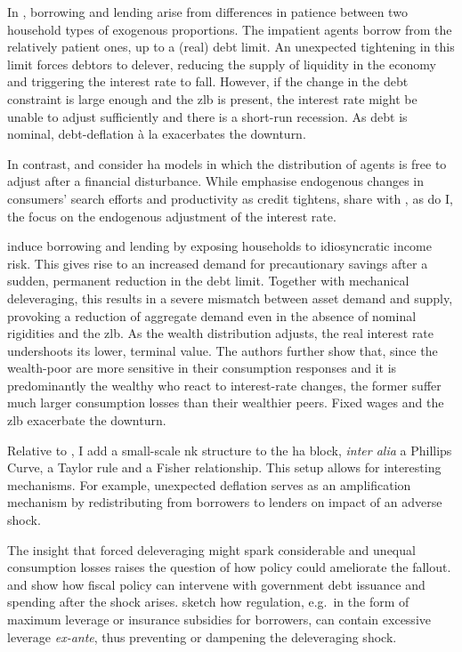 \documentclass[a4paper,12pt]{article} %
\numberwithin{equation}{section} %
\numberwithin{figure}{section}
\numberwithin{table}{section}
\begin{document}
In \textcite{egg2012}, borrowing and lending arise from differences in patience between two household types of exogenous proportions. The impatient agents borrow from the relatively patient ones, up to a (real) debt limit. An unexpected tightening in this limit forces debtors to delever, reducing the supply of liquidity in the economy and triggering the interest rate to fall. However, if the change in the debt constraint is large enough and the \Gls{zlb} is present, the interest rate might be unable to adjust sufficiently and there is a short-run recession. As debt is nominal, debt-deflation à la \textcite{fisher1933} exacerbates the downturn.

In contrast, \textcite{riosrull2015} and \textcite{gl2017} consider \Gls{ha} models in which the distribution of agents is free to adjust after a financial disturbance. While \textcite{riosrull2015} emphasise endogenous changes in consumers' search efforts and productivity as credit tightens, \textcite{gl2017} share with \textcite{egg2012}, as do I, the focus on the endogenous adjustment of the interest rate.

\textcite{gl2017} induce borrowing and lending by exposing households to idiosyncratic income risk. This gives rise to an increased demand for precautionary savings after a sudden, permanent reduction in the debt limit. Together with mechanical deleveraging, this results in a severe mismatch between asset demand and supply, provoking a reduction of aggregate demand even in the absence of nominal rigidities and the \Gls{zlb}. As the wealth distribution adjusts, the real interest rate undershoots its lower, terminal value. The authors further show that, since the wealth-poor are more sensitive in their consumption responses and it is predominantly the wealthy who react to interest-rate changes, the former suffer much larger consumption losses than their wealthier peers. Fixed wages and the \Gls{zlb} exacerbate the downturn. 

Relative to \textcite{gl2017}, I add a small-scale \Gls{nk} structure to the \Gls{ha} block, \textit{inter alia} a Phillips Curve, a Taylor rule and a Fisher relationship. This setup allows for interesting mechanisms. For example, unexpected deflation serves as an amplification mechanism by redistributing from borrowers to lenders on impact of an adverse shock.

The insight that forced deleveraging might spark considerable and unequal consumption losses raises the question of how policy could ameliorate the fallout. \textcite{egg2012} and \textcite{gl2017} show how fiscal policy can intervene with government debt issuance and spending after the shock arises. \textcite{korinek2016} sketch how regulation, e.g.~in the form of maximum leverage or insurance subsidies for borrowers, can contain excessive leverage \textit{ex-ante}, thus preventing or dampening the deleveraging shock.
\end{document}
